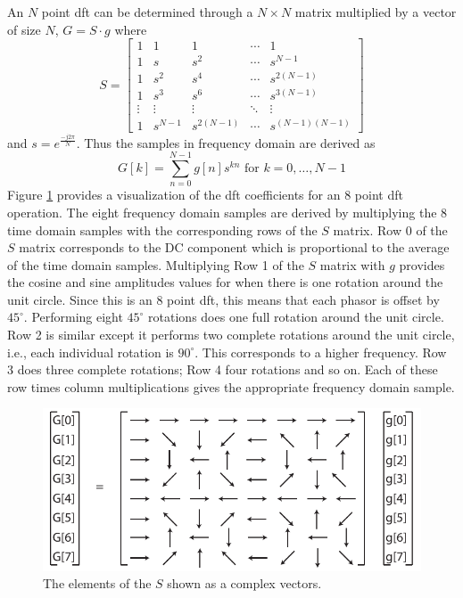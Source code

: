 An $N$ point \gls{dft} can be determined through a $N \times N$ matrix multiplied by a vector of size $N$, $G = S \cdot g$ where
\begin{equation}
S =
 \begin{bmatrix}
 \label{eq:Smatrix}
  1 & 1 & 1 & \cdots & 1 \\
  1 & s & s^2 & \cdots & s^{N-1} \\
  1 & s^2 & s^4 & \cdots & s^{2(N-1)} \\
  1 & s^3 & s^6 & \cdots & s^{3(N-1)} \\
  \vdots  & \vdots  & \vdots &\ddots & \vdots  \\
  1 & s^{N-1} & s^{2(N-1)}&\cdots & s^{(N-1)(N-1)}
 \end{bmatrix}
\end{equation} and $s = e^{\frac{-j 2 \pi}{N}}$.   Thus the samples in frequency domain are derived as 
\begin{equation}
G[k] = \displaystyle\sum\limits_{n=0}^{N-1} g[n] s^{kn} \text{ for } k = 0,\dots, N-1
\end{equation}
Figure \ref{fig:dft_visualization} provides a visualization of the \gls{dft} coefficients for an 8 point \gls{dft} operation. The eight frequency domain samples are derived by multiplying the 8 time domain samples with the corresponding rows of the $S$ matrix. Row 0 of the $S$ matrix corresponds to the DC component which is proportional to the average of the time domain samples. Multiplying Row 1 of the $S$ matrix with $g$ provides the cosine and sine amplitudes values for when there is one rotation around the unit circle. Since this is an 8 point \gls{dft}, this means that each phasor is offset by $45^{\circ}$. Performing eight $45^{\circ}$ rotations does one full rotation around the unit circle. Row 2 is similar except it performs two complete rotations around the unit circle, i.e., each individual rotation is $90^{\circ}$. This corresponds to a higher frequency. Row 3 does three complete rotations; Row 4 four rotations and so on. Each of these row times column multiplications gives the appropriate frequency domain sample. 

\begin{figure}
\centering
\includegraphics[width= 0.8 \textwidth]{images/dft-visualization}
\caption{ The elements of the $S$ shown as a complex vectors.  }
\label{fig:dft_visualization}
\end{figure}

